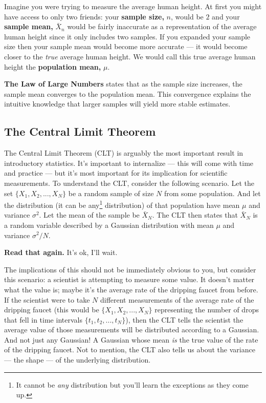 Imagine you were trying to measure the average human height. At first you might have access to only two friends: your \textbf{sample size,} $n$, would be $2$ and your \textbf{sample mean,} $\bar{X}_n$ would be fairly inaccurate as a representation of the average human height since it only includes two samples. If you expanded your sample size then your sample mean would become more accurate --- it would become closer to the \textit{true} average human height. We would call this true average human height the \textbf{population mean,} $\mu$.

\textbf{The Law of Large Numbers} states that as the sample size increases, the sample mean converges to the population mean. This convergence explains the intuitive knowledge that larger samples will yield more stable estimates.

\subsection*{The Central Limit Theorem}
The Central Limit Theorem (CLT) is arguably the most important result in introductory statistics. It's important to internalize --- this will come with time and practice --- but it's most important for its implication for scientific measurements. To understand the CLT, consider the following scenario. Let the set $\{X_1, X_2, ..., X_N\}$ be a random sample of size $N$ from some population. And let the distribution (it can be any\footnote{It cannot be \textit{any} distribution but you'll learn the exceptions as they come up.} distribution) of that population have mean $\mu$ and variance $\sigma^2$. Let the mean of the sample be $\bar{X}_N$. The CLT then states that $\bar{X}_N$ is a random variable described by a Gaussian distribution with mean $\mu$ and variance $\sigma^2/N$.

\textbf{Read that again.} It's ok, I'll wait.

The implications of this should not be immediately obvious to you, but consider this scenario: a scientist is attempting to measure some value. It doesn't matter what the value is; maybe it's the average rate of the dripping faucet from before. If the scientist were to take $N$ different measurements of the average rate of the dripping faucet (this would be $\{X_1, X_2, ..., X_N\}$ representing the number of drops that fell in time intervals $\{t_1, t_2, ..., t_N\}$), then the CLT tells the scientist the average value of those measurements will be distributed according to a Gaussian. And not just any Gaussian! A Gaussian whose mean \textit{is} the true value of the rate of the dripping faucet. Not to mention, the CLT also tells us about the variance --- the shape --- of the underlying distribution.

